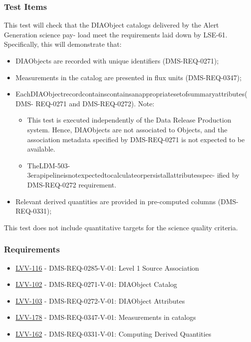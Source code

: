 \subsubsection{Test Items}\label{test-items-5}

This test will check that the DIAObject catalogs delivered by the Alert
Generation science pay- load meet the requirements laid down by
LSE-61.\\
Specifically, this will demonstrate that:

\begin{itemize}
\tightlist
\item
  DIAObjects are recorded with unique identifiers (DMS-REQ-0271);
\item
  Measurements in the catalog are presented in flux units
  (DMS-REQ-0347);
\item
  EachDIAObjectrecordcontainscontainsanappropriatesetofsummaryattributes(DMS-
  REQ-0271 and DMS-REQ-0272). Note:

  \begin{itemize}
  \tightlist
  \item
    This test is executed independently of the Data Release Production
    system. Hence, DIAObjects are not associated to Objects, and the
    association metadata specified by DMS-REQ-0271 is not expected to be
    available.
  \item
    TheLDM-503-3erapipelineisnotexpectedtocalculateorpersistallattributesspec-
    ified by DMS-REQ-0272 requirement.
  \end{itemize}
\item
  Relevant derived quantities are provided in pre-computed columns
  (DMS-REQ-0331);~
\end{itemize}

This test does not include quantitative targets for the science quality
criteria.

\subsubsection{Requirements}\label{requirements-5}

\begin{itemize}
\tightlist
\item
  \href{https://jira.lsstcorp.org/browse/LVV-116}{LVV-116} -
  DMS-REQ-0285-V-01: Level 1 Source Association
\item
  \href{https://jira.lsstcorp.org/browse/LVV-102}{LVV-102} -
  DMS-REQ-0271-V-01: DIAObject Catalog
\item
  \href{https://jira.lsstcorp.org/browse/LVV-103}{LVV-103} -
  DMS-REQ-0272-V-01: DIAObject Attributes
\item
  \href{https://jira.lsstcorp.org/browse/LVV-178}{LVV-178} -
  DMS-REQ-0347-V-01: Measurements in catalogs
\item
  \href{https://jira.lsstcorp.org/browse/LVV-162}{LVV-162} -
  DMS-REQ-0331-V-01: Computing Derived Quantities
\end{itemize}

